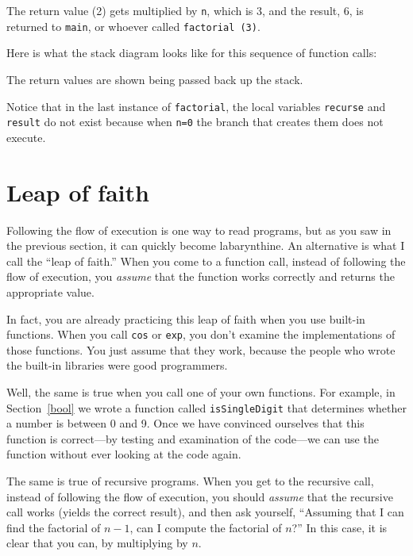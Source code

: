 \noindent The return value (2) gets multiplied by {\tt n}, which is 3,
and the result, 6, is returned to {\tt main}, or whoever
called {\tt factorial (3)}.


Here is what the stack diagram looks like for this sequence of
function calls:

\vspace{0.1in}
\centerline{}
\vspace{0.1in}
%
The return values are shown being passed back up the stack.

Notice that in the last instance of {\tt factorial}, the local
variables {\tt recurse} and {\tt result} do not exist because
when {\tt n=0} the branch that creates them does not execute.

\section{Leap of faith}

Following the flow of execution is one way to read programs, but as
you saw in the previous section, it can quickly become labarynthine.
An alternative is what I call the ``leap of faith.''  When you come to
a function call, instead of following the flow of execution, you
{\em assume} that the function works correctly and returns the
appropriate value.

In fact, you are already practicing this leap of faith
when you use built-in functions.  When you call {\tt cos}
or {\tt exp}, you don't examine the implementations of 
those functions.  You just assume that they work, because the people
who wrote the built-in libraries were good programmers.

Well, the same is true when you call one of your own functions.
For example, in Section~\ref{bool} we wrote a function called
{\tt isSingleDigit} that determines whether a number is between
0 and 9.  Once we have convinced ourselves that this function
is correct---by testing and examination of the code---we can
use the function without ever looking at the code again.

The same is true of recursive programs.  When you get to the recursive
call, instead of following the flow of execution, you should {\em
assume} that the recursive call works (yields the correct result), and
then ask yourself, ``Assuming that I can find the factorial of $n-1$,
can I compute the factorial of $n$?''  In this case, it is clear that
you can, by multiplying by $n$.

